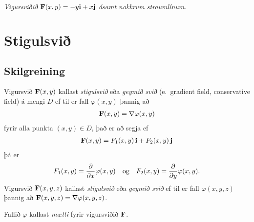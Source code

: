 \documentclass[a4paper,10pt,icelandic]{sphinxmanual}
\begin{document}
\emph{Vigursviðið} \(\mathbf{F}(x,y) = -y\mbox{${\bf i}$}+ x \mbox{${\bf j}$}\)
\emph{ásamt nokkrum straumlínum}.


\section{Stigulsvið}
\label{Kafli5:index-2}\label{Kafli5:stigulsvi}

\subsection{Skilgreining}
\label{Kafli5:id3}
Vigursvið \(\mbox{${\bf F}$}(x,y)\) kallast \emph{stigulsvið} eða \emph{geymið
svið} (e. gradient field, conservative field) á mengi \(D\) ef til
er fall \(\varphi(x,y)\) þannig að
\begin{gather}
\begin{split}\displaystyle \mbox{${\bf F}$}(x,y)=\nabla\varphi(x,y)\end{split}\notag
\end{gather}
fyrir alla punkta \((x,y)\in D\), það er að segja ef
\begin{gather}
\begin{split}\displaystyle \mbox{${\bf F}$}(x,y)=F_1(x,y)\,\mbox{${\bf i}$}+F_2(x,y)\,\mbox{${\bf j}$}\end{split}\notag
\end{gather}
þá er
\begin{gather}
\begin{split}\displaystyle F_1(x,y)=\frac{\partial}{\partial x}\varphi(x,y) \quad \text{og}\quad  F_2(x,y)=\frac{\partial}{\partial y}\varphi(x,y).\end{split}\notag
\end{gather}
Vigursvið \(\mbox{${\bf F}$}(x,y,z)\) kallast \emph{stigulsvið} eða
\emph{geymið svið} ef til er fall \(\varphi(x,y,z)\) þannig að
\(\mbox{${\bf F}$}(x,y,z)=\nabla\varphi(x,y,z)\).

Fallið \(\varphi\) kallast \textit{mætti}  fyrir vigursviðið
\(\mbox{${\bf F}$}\).
\end{document}
